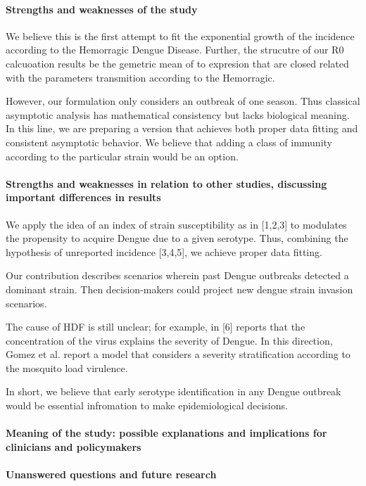     \paragraph{Strengths and weaknesses of the study}
        We believe this is the first attempt to fit the exponential 
    growth of the incidence according to the Hemorragic Dengue Disease. 
    Further, the strucutre of our R0 calcuoation results be 
    the gemetric mean of to expresion that are closed related 
    with the parameters transmition according to the Hemorragic.  

    
        However, our formulation only considers an outbreak of one season.
    Thus classical asymptotic analysis has mathematical consistency
    but lacks biological meaning.  In this line, we are preparing a
    version that achieves both \textemdash proper data fitting and consistent
    asymptotic behavior. We believe that adding a class of immunity
    according to the particular strain would be an option.

    \paragraph{Strengths and weaknesses in relation 
        to other studies, discussing important
        differences in results}
        
        We apply the idea of an index of strain susceptibility as in [1,2,3] 
    to modulates the propensity to acquire Dengue due to a given serotype.  Thus,
    combining the hypothesis of unreported incidence [3,4,5], we achieve
    proper data fitting.

        Our contribution describes scenarios wherein past Dengue outbreaks
    detected a dominant strain. Then decision-makers could project new
    dengue strain invasion scenarios.

        The cause of HDF is still unclear; for example, in [6] reports that
    the concentration of the virus explains the severity of Dengue. In
    this direction, Gomez et al. report a model that considers a severity
    stratification according to the mosquito load virulence.

        In short, we believe that early serotype identification in any Dengue
    outbreak would be essential infromation to make epidemiological decisions.
    
    
    \paragraph{Meaning of the study: possible explanations 
    and implications for clinicians
    and policymakers}
    \paragraph{Unanswered questions and future research}